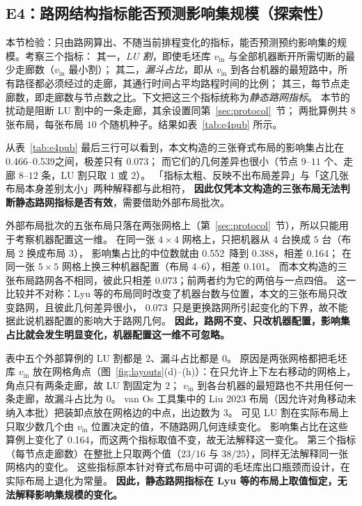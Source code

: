 \documentclass[manuscript,screen,review]{acmart}
\newcommand{\NSeeds}{10}
\newcommand{\PubCloLo}{0.388}
\newcommand{\PubCloHi}{0.552}
\newcommand{\PubCloSpread}{0.164}
\newcommand{\PubCloSpreadBig}{0.101}
\newcommand{\SelfCloLo}{0.466}
\newcommand{\SelfCloHi}{0.539}
\newcommand{\SelfCloSpread}{0.073}
\begin{document}
\subsection{E4：路网结构指标能否预测影响集规模（探索性）}
\label{sec:e4}

本节检验：只由路网算出、不随当前排程变化的指标，能否预测预约影响集的规模。考察三个指标：
其一，\emph{LU 割}，即使毛坯库 \(v_{\mathrm{in}}\) 与全部机器断开所需切断的最少走廊数（\(v_{\mathrm{in}}\) 最小割）；
其二，\emph{漏斗占比}，即从 \(v_{\mathrm{in}}\) 到各台机器的最短路中，所有路径都必须经过的走廊，其通行时间占平均路程时间的比例；
其三，每节点走廊数，即走廊数与节点数之比。下文把这三个指标统称为\emph{静态路网指标}。
本节的扰动是阻断 LU 割中的一条走廊，其余设置同第~\ref{sec:protocol}~节；
两批算例共 \(8\) 张布局，每张布局 \(\NSeeds\) 个随机种子。结果如表~\ref{tab:e4pub} 所示。

从表~\ref{tab:e4pub} 最后三行可以看到，本文构造的三张脊式布局的影响集占比在 \SelfCloLo--\SelfCloHi 之间，极差只有 \SelfCloSpread；
而它们的几何差异也很小（节点 \(9\)--\(11\) 个、走廊 \(8\)--\(12\) 条，LU 割只取 \(1\) 或 \(2\)）。
「指标太粗、反映不出布局差异」与「这几张布局本身差别太小」两种解释都与此相符，
\textbf{因此仅凭本文构造的三张布局无法判断静态路网指标是否有效}，需要借助外部布局批次。

外部布局批次的五张布局只落在两张网格上（第~\ref{sec:protocol}~节），所以只能用于考察机器配置这一维。
在同一张 \(4\times 4\) 网格上，只把机器从 \(4\) 台换成 \(5\) 台（布局 2 换成布局 3），
影响集占比的中位数就由 \PubCloHi\ 降到 \PubCloLo，相差 \PubCloSpread；
在同一张 \(5\times 5\) 网格上换三种机器配置（布局 4--6），相差 \PubCloSpreadBig。
而本文构造的三张布局路网各不相同，彼此只相差 \SelfCloSpread；前两者约为它的两倍与一点四倍。
这一比较并不对称：Lyu 等的布局同时改变了机器台数与位置，本文的三张布局只改变路网，且彼此几何差异很小，
\SelfCloSpread\ 只是更换路网所引起变化的下界，故不能据此说机器配置的影响大于路网几何。
\textbf{因此，路网不变、只改机器配置，影响集占比就会发生明显变化，机器配置这一维不可忽略。}

表中五个外部算例的 LU 割都是 \(2\)、漏斗占比都是 \(0\)。
原因是两张网格都把毛坯库 \(v_{\mathrm{in}}\) 放在网格角点（图~\ref{fig:layouts}(d)--(h)）：在只允许上下左右移动的网格上，角点只有两条走廊，故 LU 割固定为 \(2\)；
\(v_{\mathrm{in}}\) 到各台机器的最短路也不共用任何一条走廊，故漏斗占比为 \(0\)。
van Os 工具集中的 Liu 2023 布局（因允许对角移动未纳入本批）把装卸点放在网格边的中点，出边数为 \(3\)。
可见 LU 割在实际布局上只取少数几个由 \(v_{\mathrm{in}}\) 位置决定的值，不随路网几何连续变化。
影响集占比在这些算例上变化了 \PubCloSpread，而这两个指标取值不变，故无法解释这一变化。
第三个指标（每节点走廊数）在整批上只取两个值（\(23/16\) 与 \(38/25\)），同样无法解释同一张网格内的变化。
这些指标原本针对脊式布局中可调的毛坯库出口瓶颈而设计，在实际布局上退化为常量。
\textbf{因此，静态路网指标在 Lyu 等的布局上取值恒定，无法解释影响集规模的变化。}
\end{document}
